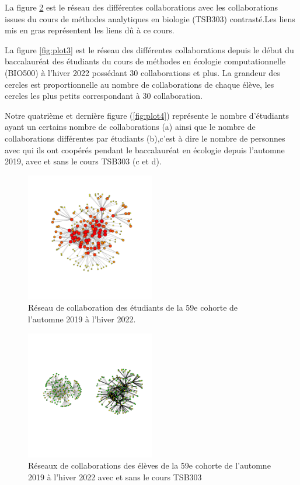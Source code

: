 \documentclass[9pt,twocolumn,twoside,]{pnas-new}
\begin{document}
La figure \ref{fig:plot2} est le réseau des différentes collaborations
avec les collaborations issues du cours de méthodes analytiques en
biologie (TSB303) contrasté.Les liens mis en gras représentent les liens
dû à ce cours.

La figure \ref{fig:plot3} est le réseau des différentes collaborations
depuis le début du baccalauréat des étudiants du cours de méthodes en
écologie computationnelle (BIO500) à l'hiver 2022 possédant 30
collaborations et plus. La grandeur des cercles est proportionnelle au
nombre de collaborations de chaque élève, les cercles les plus petits
correspondant à 30 collaboration.

Notre quatrième et dernière figure (\ref{fig:plot4}) représente le
nombre d'étudiants ayant un certains nombre de collaborations (a) ainsi
que le nombre de collaborations différentes par étudiants (b),c'est à
dire le nombre de personnes avec qui ils ont coopérés pendant le
baccalauréat en écologie depuis l'automne 2019, avec et sans le cours
TSB303 (c et d).

\begin{figure}
\centering
\includegraphics[width=0.5\textwidth,height=0.4\textheight]{"../results/figure1.png"}
\caption{Réseau de collaboration des étudiants de la 59e cohorte de
l'automne 2019 à l'hiver 2022. \label{fig:plot1}}
\end{figure}

\begin{figure}
\centering
\includegraphics[width=0.5\textwidth,height=0.4\textheight]{"../results/figure2.png"}
\caption{Réseaux de collaborations des élèves de la 59e cohorte de
l'automne 2019 à l'hiver 2022 avec et sans le cours TSB303
\label{fig:plot2}}
\end{figure}
\end{document}
